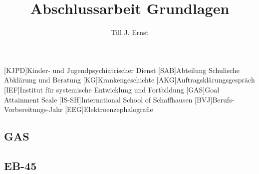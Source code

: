 


\title{Abschlussarbeit Grundlagen}
\author{Till J. Ernst}






\tableofcontents
\newpage

\begin{acronym}[KJPD]
[KJPD]{Kinder- und Jugendpsychiatrischer Dienst}
[SAB]{Abteilung Schulische Abklärung und Beratung}
[KG]{Krankengeschichte}
[AKG]{Auftragsklärungsgespräch}
[IEF]{Institut für systemische Entwicklung und Fortbildung}
[GAS]{Goal Attainment Scale}
[IS-SH]{International School of Schaffhausen}
[BVJ]{Berufs-Vorbereitungs-Jahr}
[EEG]{Elektroenzephalografie}
\end{acronym}
\newpage













\renewcommand{\appendixtocname}{Anhang}
\renewcommand{\appendixname}{Anhang}
\renewcommand{\appendixpagename}{Anhang}

\newpage
\appendixpage
\addappheadtotoc
\subsection{GAS}
\subsection{EB-45}



\newpage
\begin{flushleft}
{}
\end{flushleft}


%
%
%